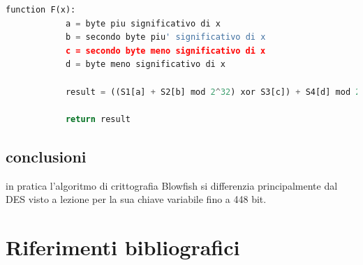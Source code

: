 \documentclass[a4paper,12pt]{report}
\begin{document}
	\begin{lstlisting}[style=codeStyle,language=python]
		function F(x):
			a = byte piu significativo di x
			b = secondo byte piu' significativo di x
			c = secondo byte meno significativo di x
			d = byte meno significativo di x
			
			result = ((S1[a] + S2[b] mod 2^32) xor S3[c]) + S4[d] mod 2^32
			
			return result
	\end{lstlisting}
	\section*{conclusioni}
	in pratica l'algoritmo di crittografia Blowfish si differenzia
	principalmente dal DES visto a lezione per la sua chiave variabile fino a
	448 bit. \cite{blfh-lenth-key}







	\newpage
	
	\renewcommand{\bibsection}{}
	\chapter*{Riferimenti bibliografici}
	
\end{document}
